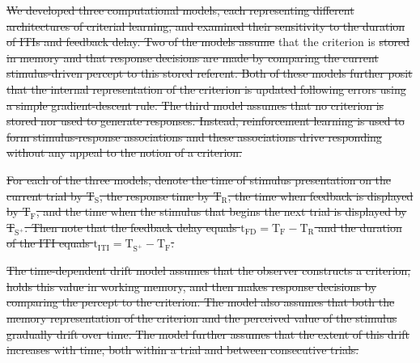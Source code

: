 \documentclass[doc, floatsintext]{apa7}
\providecommand{\DIFadd}[1]{{\protect\color{blue}\uwave{#1}}} %
\providecommand{\DIFdel}[1]{{\protect\color{red}\sout{#1}}}                      %
\providecommand{\DIFaddbegin}{} %
\providecommand{\DIFaddend}{} %
\providecommand{\DIFdelbegin}{} %
\providecommand{\DIFdelend}{} %
\newcommand{\DIFscaledelfig}{0.5}
\newlength{\DIFdelgraphicswidth} %
\newlength{\DIFdelgraphicsheight} %
\newcommand{\DIFaddincludegraphics}[2][]{{\color{blue}\fbox{\DIFOincludegraphics[#1]{#2}}}} %
\newcommand{\DIFdelincludegraphics}[2][]{%
\sbox{\DIFdelgraphicsbox}{\DIFOincludegraphics[#1]{#2}}%
\settoboxwidth{\DIFdelgraphicswidth}{\DIFdelgraphicsbox} %
\settoboxtotalheight{\DIFdelgraphicsheight}{\DIFdelgraphicsbox} %
\scalebox{\DIFscaledelfig}{%
\parbox[b]{\DIFdelgraphicswidth}{\usebox{\DIFdelgraphicsbox}\\[-\baselineskip] \rule{\DIFdelgraphicswidth}{0em}}\llap{\resizebox{\DIFdelgraphicswidth}{\DIFdelgraphicsheight}{%
\setlength{\unitlength}{\DIFdelgraphicswidth}%
\begin{picture}(1,1)%
\thicklines\linethickness{2pt} %
{\color[rgb]{1,0,0}\put(0,0){\framebox(1,1){}}}%
{\color[rgb]{1,0,0}\put(0,0){\line( 1,1){1}}}%
{\color[rgb]{1,0,0}\put(0,1){\line(1,-1){1}}}%
\end{picture}%
}\hspace*{3pt}}} %
} %
\DeclareRobustCommand{\DIFaddbegin}{\DIFOaddbegin \let\includegraphics\DIFaddincludegraphics} %
\DeclareRobustCommand{\DIFaddend}{\DIFOaddend \let\includegraphics\DIFOincludegraphics} %
\DeclareRobustCommand{\DIFdelbegin}{\DIFOdelbegin \let\includegraphics\DIFdelincludegraphics} %
\DeclareRobustCommand{\DIFdelend}{\DIFOaddend \let\includegraphics\DIFOincludegraphics} %
\begin{document}
\DIFdel{We developed three computational models,
each representing
different architectures of criterial learning, and examined
their sensitivity to the duration of ITIs and feedback
delay. Two of the models assume }\DIFdelend \DIFaddbegin \DIFadd{,
and therefore }\DIFaddend that the criterion is \DIFdelbegin \DIFdel{stored
in memory and that response decisions are made by comparing
the current stimulus-driven percept to this stored referent.
Both of these models further posit that the internal
representation of the criterion is updated following errors
using a simple gradient-descent rule. The third model
assumes that no criterion is stored nor used to generate
responses. Instead, reinforcement learning is used to form
stimulus-response associations and these associations drive
responding without any appeal to the notion of a criterion. 
}%

\DIFdel{For each of the three models, denote the time of stimulus
presentation on the current trial by T$_\text{S}$, the
response time by T$_\text{R}$, the time when feedback is
displayed by T$_\text{F}$, and the time when the stimulus
that begins the next trial is displayed by T$_{\text{S}^+}$.
Then note that the feedback delay equals
$\text{t}_\text{FD} = \text{T}_\text{F} - \text{T}_\text{R}$
and the duration of the ITI equals $\text{t}_\text{ITI} =
\text{T}_{\text{S}^+} - \text{T}_\text{F}$.
}%

\DIFdel{The time-dependent drift model assumes that the observer
constructs a criterion, holds this value in working memory,
and then makes response decisions by comparing the percept
to the criterion.
The model also assumes that both the
memory representation of the criterion and the perceived
value of the stimulus gradually drift over time. The model
further assumes that the extent of this drift increases with
time, both within a trial and between consecutive trials.
}%
\end{document}
